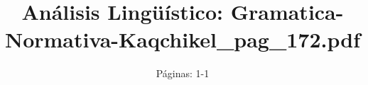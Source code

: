 \documentclass{article}%
\title{Análisis Lingüístico: Gramatica{-}Normativa{-}Kaqchikel\_pag\_172.pdf}%
\author{Páginas: 1{-}1}%
\begin{document}
%
\normalsize%
\maketitle%
\end{document}
